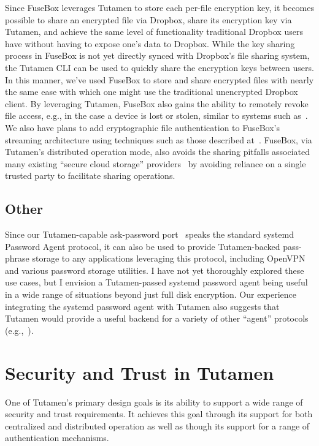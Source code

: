 Since FuseBox leverages Tutamen to store each per-file encryption key,
it becomes possible to share an encrypted file via Dropbox, share its
encryption key via Tutamen, and achieve the same level of
functionality traditional Dropbox users have without having to expose
one's data to Dropbox. While the key sharing process in FuseBox is not
yet directly synced with Dropbox's file sharing system, the Tutamen
CLI can be used to quickly share the encryption keys between users. In
this manner, we've used FuseBox to store and share encrypted files
with nearly the same ease with which one might use the traditional
unencrypted Dropbox client. By leveraging Tutamen, FuseBox also gains
the ability to remotely revoke file access, e.g., in the case a device
is lost or stolen, similar to systems such as~\cite{geambasu2011}. We
also have plans to add cryptographic file authentication to FuseBox's
streaming architecture using techniques such as those described
at~\cite{McGrew2005}. FuseBox, via Tutamen's distributed operation
mode, also avoids the sharing pitfalls associated many existing
``secure cloud storage'' providers~\cite{wilson2014} by avoiding
reliance on a single trusted party to facilitate sharing operations.

\subsection{Other}

Since our Tutamen-capable ask-password
port~\cite{src-tutamen-askpassword} speaks the standard systemd
Password Agent protocol, it can also be used to provide Tutamen-backed
pass-phrase storage to any applications leveraging this protocol,
including OpenVPN and various password storage utilities. I have not
yet thoroughly explored these use cases, but I envision a
Tutamen-passed systemd password agent being useful in a wide range of
situations beyond just full disk encryption. Our experience
integrating the systemd password agent with Tutamen also suggests that
Tutamen would provide a useful backend for a variety of other
``agent'' protocols (e.g.,~\cite{cox2002, ylonen1996}).

\section{Security and Trust in Tutamen}
\label{chap:tutamen:trust}

One of Tutamen's primary design goals is its ability to support a wide
range of security and trust requirements. It achieves this goal
through its support for both centralized and distributed operation as
well as though its support for a range of authentication mechanisms.


